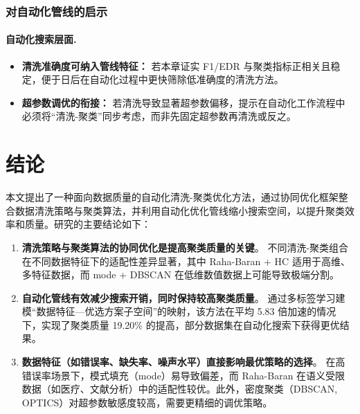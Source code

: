 \documentclass[10pt]{article} %
\numberwithin{equation}{section}
\begin{document}
\subsubsection{对自动化管线的启示}
\label{subsec:discussion_automl}

\paragraph{自动化搜索层面.}
\begin{itemize}
    \item \textbf{清洗准确度可纳入管线特征：}
    若本章证实 F1/EDR 与聚类指标正相关且稳定，便于日后在自动化过程中更快筛除低准确度的清洗方法。
    \item \textbf{超参数调优的衔接：}
    若清洗导致显著超参数偏移，提示在自动化工作流程中必须将“清洗-聚类”同步考虑，而非先固定超参数再清洗或反之。
\end{itemize}



\section{结论}
\label{sec:conclusion}

本文提出了一种面向数据质量的自动化清洗-聚类优化方法，通过协同优化框架整合数据清洗策略与聚类算法，并利用自动化优化管线缩小搜索空间，以提升聚类效率和质量。研究的主要结论如下：

\begin{enumerate}
    \item \textbf{清洗策略与聚类算法的协同优化是提高聚类质量的关键}。  
    不同清洗-聚类组合在不同数据特征下的适配性差异显著，其中 Raha-Baran + HC 适用于高维、多特征数据，而 mode + DBSCAN 在低维数值数据上可能导致极端分割。

    \item \textbf{自动化管线有效减少搜索开销，同时保持较高聚类质量}。  
    通过多标签学习建模“数据特征—优选方案子空间”的映射，该方法在平均 5.83 倍加速的情况下，实现了聚类质量 19.20\% 的提高，部分数据集在自动化搜索下获得更优结果。

    \item \textbf{数据特征（如错误率、缺失率、噪声水平）直接影响最优策略的选择}。  
    在高错误率场景下，模式填充（mode）易导致偏差，而 Raha-Baran 在语义受限数据（如医疗、文献分析）中的适配性较优。此外，密度聚类（DBSCAN, OPTICS）对超参数敏感度较高，需要更精细的调优策略。
\end{enumerate}
\end{document}
